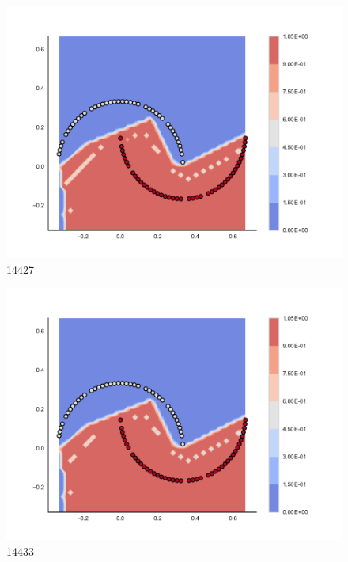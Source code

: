 \begin{subfigure}[b]{0.09\textwidth}
    \includegraphics[clip, trim=2.35cm 1.75cm 4.5cm 0cm,width=\textwidth]{img/convergence/14427.pdf}
    \caption{14427}
    \label{fig:convergence_14427}
\end{subfigure}
%
\begin{subfigure}[b]{0.09\textwidth}
    \includegraphics[clip, trim=2.35cm 1.75cm 4.5cm 0cm,width=\textwidth]{img/convergence/14433.pdf}
    \caption{14433}
    \label{fig:convergence_14433}
\end{subfigure}
%
